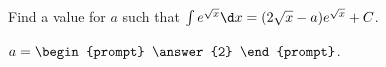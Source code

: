 \documentclass{ximera}
\author{Jim Talamo}
\begin{document}
\begin{exercise}
Find a value for $a$ such that $\int e^{\sqrt{x}} \d x = (2 \sqrt{x} -a)e^{\sqrt{x}} +C$. 

$a = \begin{prompt} \answer{2} \end{prompt}$.


\end{exercise}
\end{document}
